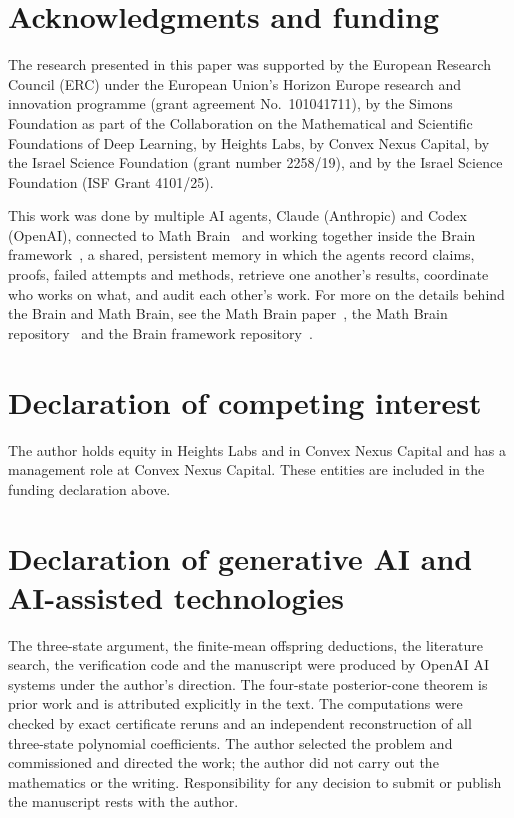 \section*{Acknowledgments and funding}
The research presented in this paper was supported by the European Research Council (ERC) under the European Union's Horizon Europe research and innovation programme (grant agreement No.~101041711), by the Simons Foundation as part of the Collaboration on the Mathematical and Scientific Foundations of Deep Learning, by Heights Labs, by Convex Nexus Capital, by the Israel Science Foundation (grant number 2258/19), and by the Israel Science Foundation (ISF Grant 4101/25).

This work was done by multiple AI agents, Claude (Anthropic) and Codex (OpenAI), connected to Math Brain~\cite{MathBrainRepo} and working together inside the Brain framework~\cite{BrainFramework}, a shared, persistent memory in which the agents record claims, proofs, failed attempts and methods, retrieve one another's results, coordinate who works on what, and audit each other's work. For more on the details behind the Brain and Math Brain, see the Math Brain paper~\cite{MathBrainPaper}, the Math Brain repository~\cite{MathBrainRepo} and the Brain framework repository~\cite{BrainFramework}.

\section*{Declaration of competing interest}
The author holds equity in Heights Labs and in Convex Nexus Capital and has a management role at Convex Nexus Capital. These entities are included in the funding declaration above.

\section*{Declaration of generative AI and AI-assisted technologies}
The three-state argument, the finite-mean offspring deductions, the literature search, the verification code and the manuscript were produced by OpenAI AI systems under the author's direction. The four-state posterior-cone theorem is prior work and is attributed explicitly in the text. The computations were checked by exact certificate reruns and an independent reconstruction of all three-state polynomial coefficients. The author selected the problem and commissioned and directed the work; the author did not carry out the mathematics or the writing. Responsibility for any decision to submit or publish the manuscript rests with the author.
